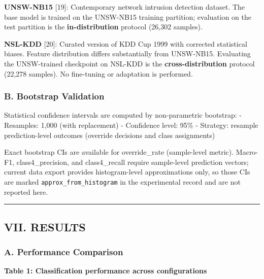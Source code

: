 \documentclass[
  conference]{IEEEtran}
\begin{document}
\textbf{UNSW-NB15} {[}19{]}: Contemporary network intrusion detection
dataset. The base model is trained on the UNSW-NB15 training partition;
evaluation on the test partition is the \textbf{in-distribution}
protocol (26,302 samples).

\textbf{NSL-KDD} {[}20{]}: Curated version of KDD Cup 1999 with
corrected statistical biases. Feature distribution differs substantially
from UNSW-NB15. Evaluating the UNSW-trained checkpoint on NSL-KDD is the
\textbf{cross-distribution} protocol (22,278 samples). No fine-tuning or
adaptation is performed.

\subsubsection{B. Bootstrap Validation}\label{b.-bootstrap-validation}

Statistical confidence intervals are computed by non-parametric
bootstrap: - Resamples: 1,000 (with replacement) - Confidence level:
95\% - Strategy: resample prediction-level outcomes (override decisions
and class assignments)

Exact bootstrap CIs are available for override\_rate (sample-level
metric). Macro-F1, class4\_precision, and class4\_recall require
sample-level prediction vectors; current data export provides
histogram-level approximations only, so those CIs are marked
\texttt{approx\_from\_histogram} in the experimental record and are not
reported here.

\begin{center}\rule{0.5\linewidth}{0.5pt}\end{center}

\subsection{VII. RESULTS}\label{vii.-results}

\subsubsection{A. Performance
Comparison}\label{a.-performance-comparison}

\textbf{Table 1: Classification performance across configurations}
\end{document}
